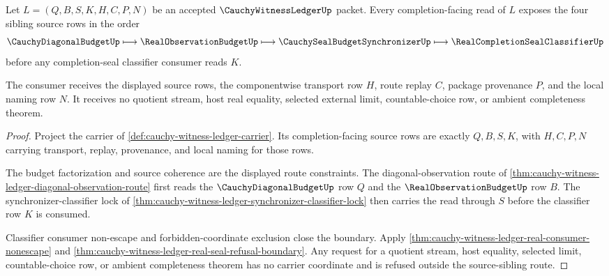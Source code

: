 \begin{theorem}
\label{thm:cauchy-witness-ledger-source-sibling-readback}
Let $L=(Q,B,S,K,H,C,P,N)$ be an accepted
$\CauchyWitnessLedgerUp$ packet. Every completion-facing read of $L$ exposes
the four sibling source rows in the order
$$
\CauchyDiagonalBudgetUp \longmapsto
\RealObservationBudgetUp \longmapsto
\CauchySealBudgetSynchronizerUp \longmapsto
\RealCompletionSealClassifierUp
$$
before any completion-seal classifier consumer reads $K$.

The consumer receives the displayed source rows, the componentwise transport
row $H$, route replay $C$, package provenance $P$, and the local naming row
$N$. It receives no quotient stream, host real equality, selected external
limit, countable-choice row, or ambient completeness theorem.
\end{theorem}
\begin{proof}
Project the carrier of \autoref{def:cauchy-witness-ledger-carrier}. Its
completion-facing source rows are exactly $Q,B,S,K$, with $H,C,P,N$ carrying
transport, replay, provenance, and local naming for those rows.

The budget factorization and source coherence are the displayed route
constraints. The diagonal-observation route of
\autoref{thm:cauchy-witness-ledger-diagonal-observation-route} first reads the
$\CauchyDiagonalBudgetUp$ row $Q$ and the $\RealObservationBudgetUp$ row $B$.
The synchronizer-classifier lock of
\autoref{thm:cauchy-witness-ledger-synchronizer-classifier-lock} then carries
the read through $S$ before the classifier row $K$ is consumed.

Classifier consumer non-escape and forbidden-coordinate exclusion close the
boundary. Apply \autoref{thm:cauchy-witness-ledger-real-consumer-nonescape}
and \autoref{thm:cauchy-witness-ledger-real-seal-refusal-boundary}. Any
request for a quotient stream, host equality, selected limit, countable-choice
row, or ambient completeness theorem has no carrier coordinate and is refused
outside the source-sibling route.
\end{proof}

